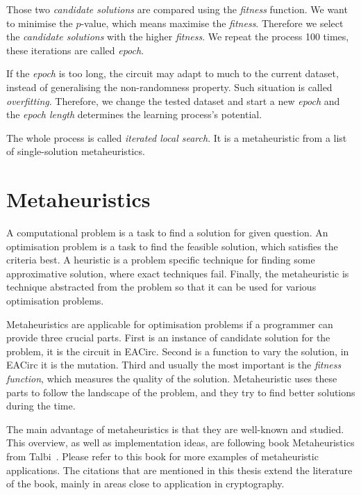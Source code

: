 \documentclass[
    digital,    %
    oneside,    %
    color,
    11pt,
    nocover,
    notable,
    nolof,
    nolot,
]{fithesis3}
\begin{document}
Those two \textit{candidate solutions} are compared using the \textit{fitness} function. We want to minimise the $p$-value, which means maximise the \textit{fitness}. Therefore we select the \textit{candidate solutions} with the higher \textit{fitness}. We repeat the process 100 times, these iterations are called \textit{epoch}.

If the \textit{epoch} is too long, the circuit may adapt to much to the current dataset, instead of generalising the non-randomness property. Such situation is called \textit{overfitting}. Therefore, we change the tested dataset and start a new \textit{epoch} and the \textit{epoch length} determines the learning process's potential.

The whole process is called \textit{iterated local search}. It is a metaheuristic from a list of single-solution metaheuristics.


\chapter{Metaheuristics}
\label{chap:metaheuristics}

A computational problem is a task to find a solution for given question. An optimisation problem is a task to find the feasible solution, which satisfies the criteria best. A heuristic is a problem specific technique for finding some approximative solution, where exact techniques fail. Finally, the metaheuristic is technique abstracted from the problem so that it can be used for various optimisation problems.

Metaheuristics are applicable for optimisation problems if a programmer can provide three crucial parts. First is an instance of candidate solution for the problem, it is the circuit in EACirc. Second is a function to vary the solution, in EACirc it is the mutation. Third and usually the most important is the \textit{fitness function}, which measures the quality of the solution. Metaheuristic uses these parts to follow the landscape of the problem, and they try to find better solutions during the time.

The main advantage of metaheuristics is that they are well-known and studied. This overview, as well as implementation ideas, are following book Metaheuristics from Talbi~\cite{talbi2009metaheuristics}. Please refer to this book for more examples of metaheuristic applications. The citations that are mentioned in this thesis extend the literature of the book, mainly in areas close to application in cryptography.
\end{document}
